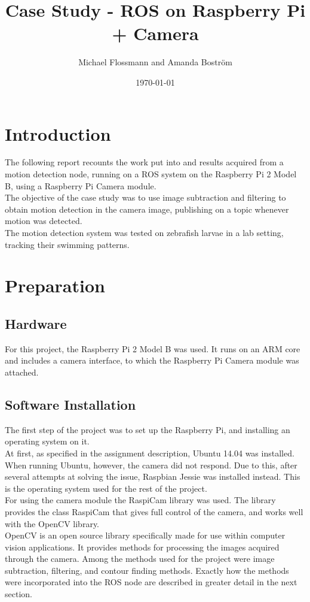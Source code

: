 \documentclass[10pt,a4paper, singlespace]{article}
\author{Michael Flossmann and Amanda Boström}
\title{Case Study - ROS on Raspberry Pi + Camera}
\date{\today}
\begin{document}
\maketitle

\section*{Introduction}

The following report recounts the work put into and results acquired from a motion detection node, running on a ROS system on the Raspberry Pi 2 Model B, using a Raspberry Pi Camera module.\\
The objective of the case study was to use image subtraction and filtering to obtain motion detection in the camera image, publishing on a topic whenever motion was detected. \\
The motion detection system was tested on zebrafish larvae in a lab setting, tracking their swimming patterns.

\section{Preparation}
\subsection{Hardware}

For this project, the Raspberry Pi 2 Model B was used. It runs on an ARM core and includes a camera interface, to which the Raspberry Pi Camera module was attached.

\subsection{Software Installation}

The first step of the project was to set up the Raspberry Pi, and installing an operating system on it. \\
At first, as specified in the assignment description, Ubuntu 14.04 was installed. When running Ubuntu, however, the camera did not respond. Due to this, after several attempts at solving the issue, Raspbian Jessie was installed instead. This is the operating system used for the rest of the project. \\
For using the camera module the RaspiCam library was used. The library provides the class RaspiCam that gives full control of the camera, and works well with the OpenCV library. \\
OpenCV is an open source library specifically made for use within computer vision applications. It provides methods for processing the images acquired through the camera. Among the methods used for the project were image subtraction, filtering, and contour finding methods. Exactly how the methods were incorporated into the ROS node are described in greater detail in the next section. \\
\end{document}
